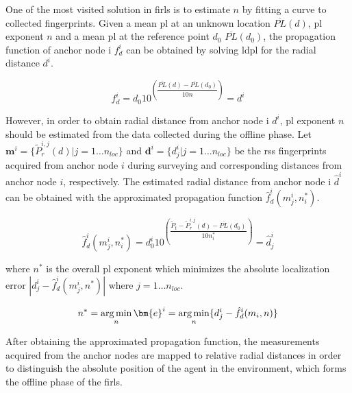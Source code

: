     One of the most visited solution in \gls{firl}s is to estimate $n$ by fitting a curve to collected fingerprints.
    Given a mean \gls{pl} at an unknown location $\overline{PL}(d)$, \gls{pl} exponent $n$ and a mean \gls{pl} at the reference point $d_0$ $\overline{PL}(d_0)$, the propagation function of anchor node i $f^i_{d}$ can be obtained by solving \gls{ldpl} for the radial distance $d^i$.

    \begin{equation}
      \label{eq:log-distance-d}
      f^i_{d} = d_0 10^{\left(\dfrac{\overline{PL}(d)-\overline{PL}(d_0)}{10 n} \right)} = d^i
    \end{equation}


    However, in order to obtain radial distance from anchor node i $d^i$, \gls{pl} exponent $n$ should be estimated from the data collected during the offline phase.
    Let $\bm{m}^i = \{\widetilde{P}_r^{i,j}(d) | j=1 \ldots n_{loc} \}$ and $\bm{d}^i = \{ d^i_j | j = 1 \ldots n_{loc}\}$ be the \gls{rss} fingerprints acquired from anchor node $i$ during surveying and corresponding distances from anchor node $i$, respectively.
    The estimated radial distance from anchor node i $\hat{d}^i$ can be obtained with the approximated propagation function $\hat{f}^i_d(m^i_j, n_i^*)$.

    \begin{equation}
      \label{eq:log-distance-d-app}
      \hat{f}^i_d(m^i_j, n_i^*) = d^i_0 10^{\left(\dfrac{\widetilde{P}_t - \widetilde{P}_r^{i,j}(d) - \overline{PL}(d_0)}{10 n_i^*} \right)} = \hat{d}^i_j
    \end{equation}

    \noindent where $n^*$ is the overall \gls{pl} exponent which minimizes the absolute localization error $|d^i_j - \hat{f}^i_d(m^i_j, n^*)|$ where  $j = 1 \ldots n_{loc}$.

    \begin{equation}
      n^* = \argmin_n \bm{e}^i  = \argmin_n \{d^i_j - \hat{f}^i_d(m_i, n)\}
    \end{equation}

    After obtaining the approximated propagation function, the measurements acquired from the anchor nodes are mapped to relative radial distances in order to distinguish the absolute position of the agent in the environment, which forms the offline phase of the \gls{firl}s.
